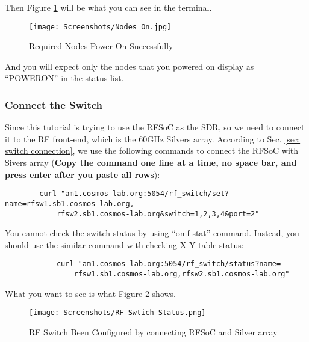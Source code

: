 \documentclass{article}
\begin{document}
            Then Figure \ref{fig: Nodes On} will be what you can see in the terminal. 
            \begin{figure}[ht]
                \centering
                \texttt{[image: Screenshots/Nodes On.jpg]}
                \caption{Required Nodes Power On Successfully}
                \vspace*{0mm}
                \label{fig: Nodes On}
            \end{figure}
            
            And you will expect only the nodes that you powered on display as ``POWERON'' in the status list. 
        
        
    
        \subsubsection{Connect the Switch} \label{sec: 60ghzTutorial - Connect Switch}
            Since this tutorial is trying to use the RFSoC as the SDR, so we need to connect it to the RF front-end, which is the 60GHz Silvers array. According to Sec. \ref{sec: switch connection}, we use the following commands to connect the RFSoC with Sivers array (\textbf{Copy the command one line at a time, no space bar, and press enter after you paste all rows}):
            \begin{verbatim}
        curl "am1.cosmos-lab.org:5054/rf_switch/set?name=rfsw1.sb1.cosmos-lab.org,
            rfsw2.sb1.cosmos-lab.org&switch=1,2,3,4&port=2"
            \end{verbatim}
        
            You cannot check the switch status by using ``omf stat'' command. Instead, you should use the similar command with checking X-Y table status:
            \begin{verbatim}
            curl "am1.cosmos-lab.org:5054/rf_switch/status?name=
                rfsw1.sb1.cosmos-lab.org,rfsw2.sb1.cosmos-lab.org"
            \end{verbatim}        
            
            What you want to see is what Figure \ref{fig: RF Swtich Status} shows. 
            \begin{figure}[ht]
                \centering
                \texttt{[image: Screenshots/RF Swtich Status.png]}
                \caption{RF Switch Been Configured by connecting RFSoC and Silver array}
                \vspace*{0mm}
                \label{fig: RF Swtich Status}
            \end{figure}
            
\end{document}
